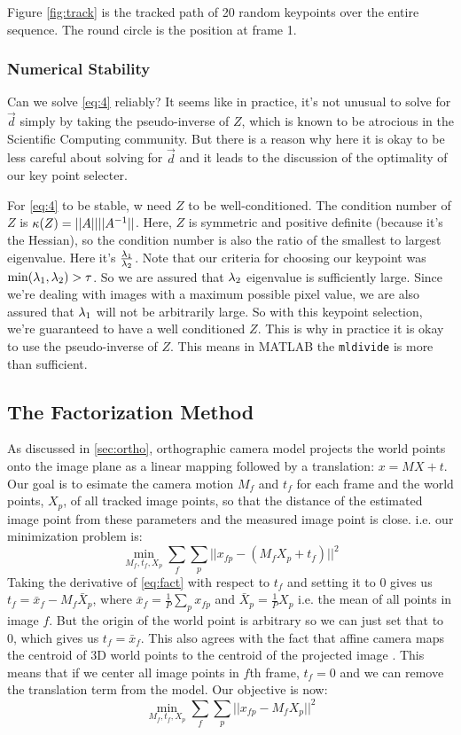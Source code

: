 Figure \ref{fig:track} is the tracked path of 20 random keypoints over
the entire sequence. The round circle is the position at frame 1.

\subsubsection{Numerical Stability}
\label{sec:numerical-stability}
Can we solve \eqref{eq:4} reliably? It seems like in practice, it's
not unusual to solve for $\vec d$ simply by taking the pseudo-inverse of $Z$,
which is known to be atrocious in the Scientific Computing
community. But there is a reason why here it is okay to be less
careful about solving for $\vec d$ and it leads to the discussion of
the optimality of our key point selecter.

For \eqref{eq:4} to be stable, w need $Z$ to be
well-conditioned. The condition number of $Z$ is $\kappa(Z) =
||A||||A^{-1}||$. Here, $Z$ is symmetric and positive definite (because
it's the Hessian), so the condition number is also the ratio of the
smallest to largest eigenvalue. Here it's $\frac{\lambda_1}{\lambda_2}$.
Note that our criteria for choosing our keypoint was $\min(\lambda_1,
\lambda_2) > \tau$. So we are assured that $\lambda_2$ eigenvalue is
sufficiently large. Since we're dealing with images with a maximum
possible pixel value, we are also assured that $\lambda_1$ will not be
arbitrarily large. So with this keypoint selection, we're guaranteed to
have a well conditioned $Z$. This is why in practice it is okay to use the pseudo-inverse
of $Z$. This means in MATLAB the \texttt{mldivide} is more than
sufficient.


\subsection{The Factorization Method}
As discussed in \ref{sec:ortho}, orthographic camera model projects
the world points onto the image plane as a linear mapping followed by
a translation: $x=MX + t$. Our goal is to esimate the camera motion
$M_f$ and $t_f$ for each frame and the world points, $X_p$, of all tracked
image points, so that the distance of the estimated image point from
these parameters and the measured image point is close. i.e. our
minimization problem is:
\begin{equation}
  \label{eq:fact}
\min_{M_f, t_f, X_p}\sum_{f}\sum_p ||x_{fp} - (M_fX_p + t_f)||^2  
\end{equation}
Taking the derivative of \eqref{eq:fact} with respect to $t_f$ and
setting it to 0 gives us $t_f = \bar x_f - M_f \bar X_p$, where $\bar
x_f =\frac{1}{P}\sum_p x_{fp}$ and $\bar X_p = \frac{1}{P}X_p$
i.e. the mean of all points in image $f$. But the origin of the world
point is arbitrary so we can just set that to 0, which gives us $t_f =
\bar x_f$. This also agrees with the fact that affine camera maps the
centroid of 3D world points to the centroid of the projected image
\cite[p438]{AZ}. This means that if we center all image points in $f$th
frame, $t_f=0$ and we can remove the translation term from the
model. Our objective is now: 
\begin{equation}
  \label{eq:fact2}
\min_{M_f, t_f, X_p}\sum_{f}\sum_p ||x_{fp} - M_fX_p||^2  
\end{equation}

